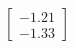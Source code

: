 \documentclass[preview]{standalone}
\begin{document}
\begin{align*}
\begin{bmatrix} -1.21 \\ -1.33 \end{bmatrix}
\end{align*}
\end{document}
